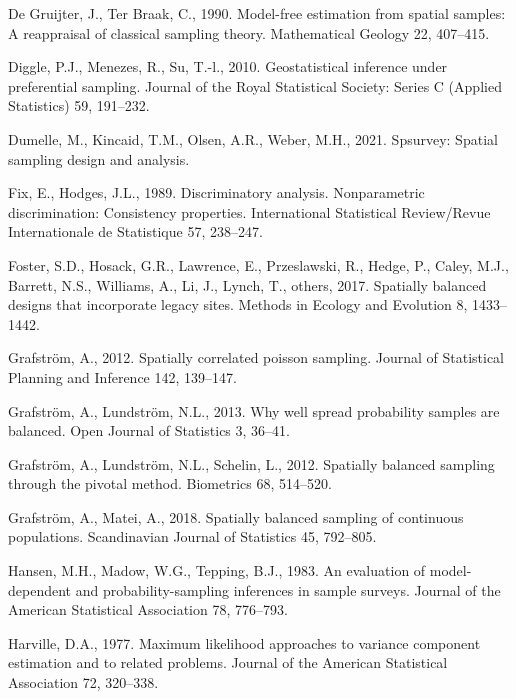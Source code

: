 \documentclass[]{elsarticle} %
\begin{document}
\leavevmode\hypertarget{ref-de1990model}{}%
De Gruijter, J., Ter Braak, C., 1990. Model-free estimation from spatial
samples: A reappraisal of classical sampling theory. Mathematical
Geology 22, 407--415.

\leavevmode\hypertarget{ref-diggle2010geostatistical}{}%
Diggle, P.J., Menezes, R., Su, T.-l., 2010. Geostatistical inference
under preferential sampling. Journal of the Royal Statistical Society:
Series C (Applied Statistics) 59, 191--232.

\leavevmode\hypertarget{ref-dumelle2021spsurvey}{}%
Dumelle, M., Kincaid, T.M., Olsen, A.R., Weber, M.H., 2021. Spsurvey:
Spatial sampling design and analysis.

\leavevmode\hypertarget{ref-fix1989discriminatory}{}%
Fix, E., Hodges, J.L., 1989. Discriminatory analysis. Nonparametric
discrimination: Consistency properties. International Statistical
Review/Revue Internationale de Statistique 57, 238--247.

\leavevmode\hypertarget{ref-foster2017spatially}{}%
Foster, S.D., Hosack, G.R., Lawrence, E., Przeslawski, R., Hedge, P.,
Caley, M.J., Barrett, N.S., Williams, A., Li, J., Lynch, T., others,
2017. Spatially balanced designs that incorporate legacy sites. Methods
in Ecology and Evolution 8, 1433--1442.

\leavevmode\hypertarget{ref-grafstrom2012spatiallypoisson}{}%
Grafström, A., 2012. Spatially correlated poisson sampling. Journal of
Statistical Planning and Inference 142, 139--147.

\leavevmode\hypertarget{ref-grafstrom2013well}{}%
Grafström, A., Lundström, N.L., 2013. Why well spread probability
samples are balanced. Open Journal of Statistics 3, 36--41.

\leavevmode\hypertarget{ref-grafstrom2012spatially}{}%
Grafström, A., Lundström, N.L., Schelin, L., 2012. Spatially balanced
sampling through the pivotal method. Biometrics 68, 514--520.

\leavevmode\hypertarget{ref-grafstrom2018spatially}{}%
Grafström, A., Matei, A., 2018. Spatially balanced sampling of
continuous populations. Scandinavian Journal of Statistics 45, 792--805.

\leavevmode\hypertarget{ref-hansen1983evaluation}{}%
Hansen, M.H., Madow, W.G., Tepping, B.J., 1983. An evaluation of
model-dependent and probability-sampling inferences in sample surveys.
Journal of the American Statistical Association 78, 776--793.

\leavevmode\hypertarget{ref-harville1977maximum}{}%
Harville, D.A., 1977. Maximum likelihood approaches to variance
component estimation and to related problems. Journal of the American
Statistical Association 72, 320--338.
\end{document}

